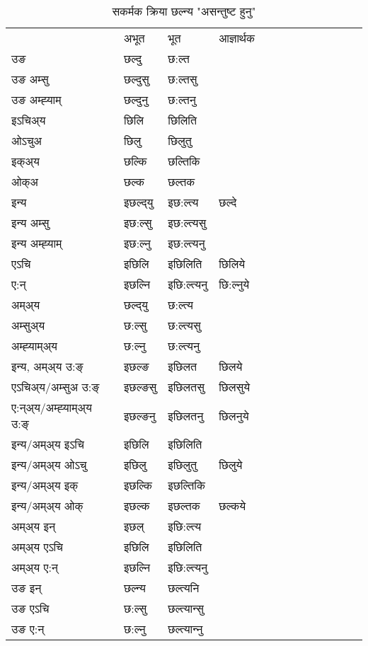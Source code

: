 \begin{table}[H]
\centering
\caption{\label{ilt.vt} सकर्मक क्रिया  छल्न्य  "असन्तुष्ट हुनु"  }
\begin{tabular}{l|l|l|l|l|l|l|l|l|l|l|l|l}  \toprule
&अभूत & भूत & आज्ञार्थक \\ 
उङ &छल्दु &छ:ल्त \\ 
उङ अम्सु&छल्दुसु &छ:ल्तसु \\ 
उङ अम्ह्‍याम्&छल्दुनु &छ:ल्तनु \\ 
इऽचिअ्य &छिलि &छिलिति   \\ 
ओऽचुअ        &छिलु &छिलुतु   \\ 
इक्अ्य&छल्कि &छल्तिकि   \\ 
ओक्अ &छल्क &छल्तक   \\ 
इन्य & इछल्द्‌यु  & इछ:ल्त्य &छल्दे  \\ 
इन्य अम्सु& इछ:ल्सु  & इछ:ल्त्यसु   \\ 
इन्य अम्ह्‍याम्& इछ:ल्नु  & इछ:ल्त्यनु   \\ 
एऽचि & इछिलि & इछिलिति &छिलिये    \\ 
ए:न् & इछल्नि  & इछि:ल्त्यनु &छि:ल्नुये  \\ 
अम्अ्य & छल्द्‌यु  & छ:ल्त्य  \\ 
अम्सुअ्य & छ:ल्सु & छ:ल्त्यसु  \\ 
अम्ह्‍याम्अ्य & छ:ल्नु  & छ:ल्त्यनु \\ 
\midrule
इन्य, अम्अ्य उ:ङ्‌ &इछल्ङ &इछिलत &छिलये \\ 
एऽचिअ्य/अम्सुअ उ:ङ्‌ &इछल्ङसु &इछिलतसु &छिलसुये \\ 
ए:न्अ्य/अम्ह्‍याम्अ्य उ:ङ्‌ &इछल्ङनु &इछिलतनु &छिलनुये \\ 
इन्य/अम्अ्य इऽचि &इछिलि &इछिलिति    \\ 
इन्य/अम्अ्य ओऽचु &इछिलु &इछिलुतु  &छिलुये  \\ 
इन्य/अम्अ्य इक् &इछल्कि &इछल्तिकि   \\ 
इन्य/अम्अ्य ओक् &इछल्क &इछल्तक  &छल्कये  \\ 
अम्अ्य इन् & इछल् & इछि:ल्त्य   \\ 
अम्अ्य एऽचि & इछिलि & इछिलिति    \\ 
अम्अ्य ए:न् & इछल्नि  & इछि:ल्त्यनु  \\ 
\midrule
उङ इन् & छल्न्य  & छल्त्यनि  \\ 
उङ एऽचि & छ:ल्सु  & छल्त्यान्सु   \\ 
उङ ए:न्& छ:ल्नु  & छल्त्यान्‍नु   \\ 
\bottomrule
\end{tabular}
\end{table}


